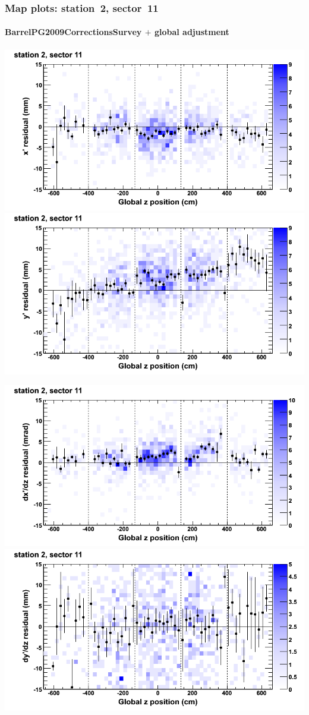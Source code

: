 \documentclass[compress]{beamer}
\begin{document}
\begin{frame}
\frametitle{Map plots: station~2, sector~11}
\framesubtitle{BarrelPG2009CorrectionsSurvey $+$ global adjustment}
\includegraphics[width=0.5\linewidth]{mapplots_re01/DTvsz_st2sec11_x.png}
\includegraphics[width=0.5\linewidth]{mapplots_re01/DTvsz_st2sec11_y.png}

\includegraphics[width=0.5\linewidth]{mapplots_re01/DTvsz_st2sec11_dxdz.png}
\includegraphics[width=0.5\linewidth]{mapplots_re01/DTvsz_st2sec11_dydz.png}
\end{frame}
\end{document}
